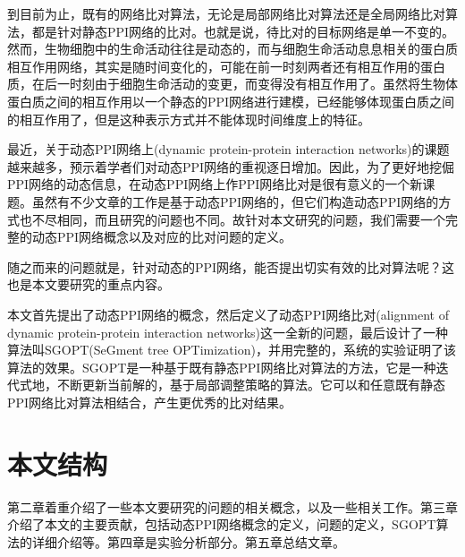 到目前为止，既有的网络比对算法，无论是局部网络比对算法还是全局网络比对算法，都是针对静态PPI网络的比对。也就是说，待比对的目标网络是单一不变的。然而，生物细胞中的生命活动往往是动态的，而与细胞生命活动息息相关的蛋白质相互作用网络，其实是随时间变化的，可能在前一时刻两者还有相互作用的蛋白质，在后一时刻由于细胞生命活动的变更，而变得没有相互作用了。虽然将生物体蛋白质之间的相互作用以一个静态的PPI网络进行建模，已经能够体现蛋白质之间的相互作用了，但是这种表示方式并不能体现时间维度上的特征。

最近，关于动态PPI网络上(dynamic protein-protein interaction networks)的课题越来越多，预示着学者们对动态PPI网络的重视逐日增加。因此，为了更好地挖倔PPI网络的动态信息，在动态PPI网络上作PPI网络比对是很有意义的一个新课题。虽然有不少文章的工作是基于动态PPI网络的\cite{lin2010dynamic,chen2014identifying,wang2013construction}，但它们构造动态PPI网络的方式也不尽相同，而且研究的问题也不同。故针对本文研究的问题，我们需要一个完整的动态PPI网络概念以及对应的比对问题的定义。

随之而来的问题就是，针对动态的PPI网络，能否提出切实有效的比对算法呢？这也是本文要研究的重点内容。

本文首先提出了动态PPI网络的概念，然后定义了动态PPI网络比对(alignment of dynamic protein-protein interaction networks)这一全新的问题，最后设计了一种算法叫SGOPT(SeGment tree OPTimization)，并用完整的，系统的实验证明了该算法的效果。SGOPT是一种基于既有静态PPI网络比对算法的方法，它是一种迭代式地，不断更新当前解的，基于局部调整策略的算法。它可以和任意既有静态PPI网络比对算法相结合，产生更优秀的比对结果。
\section{本文结构}

第二章着重介绍了一些本文要研究的问题的相关概念，以及一些相关工作。第三章介绍了本文的主要贡献，包括动态PPI网络概念的定义，问题的定义，SGOPT算法的详细介绍等。第四章是实验分析部分。第五章总结文章。

